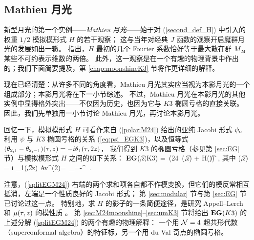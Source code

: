\subsection{Mathieu 月光}
\label{subsec:Mathieu}

新型月光的第一个实例——\emph{Mathieu 月光}——始于对 (\ref{second_def_H}) 中引入的权重 $1/2$ 模拟模形式 $H$ 的若干观察；
这与当年对经典 $J$ 函数的观察开启魔群月光的发展如出一辙。
\cite{Eguchi2010} 指出，$H$ 最初的几个 Fourier 系数恰好等于最大散在群 $M_{24}$ 某些不可约表示维数的两倍。
此外，这一观察是在一个有趣的物理背景中作出的；我们下面简要提及，第 \ref{chap:moonshineK3} 节将作更详细的解释。


现在已经清楚：从许多不同的角度看，Mathieu 月光其实应当视为本影月光的一个组成部分；本影月光将在下一小节综述。
不过，Mathieu 月光在本影月光的其他实例中显得格外突出——不仅因为历史，也因为它与 $K3$ 椭圆亏格的直接关联。
因此，我们先单独用一小节讨论 Mathieu 月光，再讨论本影月光。

回忆一下，模拟模形式 $H$  可看作来自 (\ref{polar:M24}) 给出的亚纯 Jacobi 形式 $\psi$。
利用 $\psi$ 与 $K3$ 椭圆亏格的关系 (\ref{eq:psi_EGK3})，以及恒等式 $(\theta_{2,1}-\theta_{2,-1})(\tau,z) =-i \theta_1(\tau,2z)$，
我们得到 $K3$ 的椭圆亏格（参见第 \ref{sec:EG} 节）与模拟模形式 $H$ 之间的如下关系：
\be\label{splitEGM24}
{\bf EG}(\t,z;K3) =   \,\left(24 \,\m(\t,z) + H(\t)\right)~, 
\ee
其中
\be\label{def:mu}
\m(\t,z) = {i \over \theta_{1}(\t,2z)}  {\rm Av}^{(2)} = \,\sum_{\ell=-\inf}^\inf {}~.
\ee


注意，(\ref{splitEGM24}) 右端的两个求和项各自都不作模变换，但它们的模反常相互抵消，左端是一个性质良好的 Jacobi 形式；
第 \ref{sec:modular} 节与第 \ref{sec:EG} 节已讨论过这一点。
特别地，求 $H$ 的影子的一条简便途径，是研究 Appell--Lerch 和 $\mu(\tau,z)$ 的模性质 \cite{Eguchi2009a,Zwegers2008}。
第 \ref{sec:M24moonshine}--\ref{sec:umK3} 节将给出 ${\bf EG}(K3)$ 的上述分解 (\ref{splitEGM24}) 的两个有趣的物理解释：
一个用 ${\cal N}=4$ 超共形代数（superconformal algebra）的特征标，另一个用 du Val 奇点的椭圆亏格。


